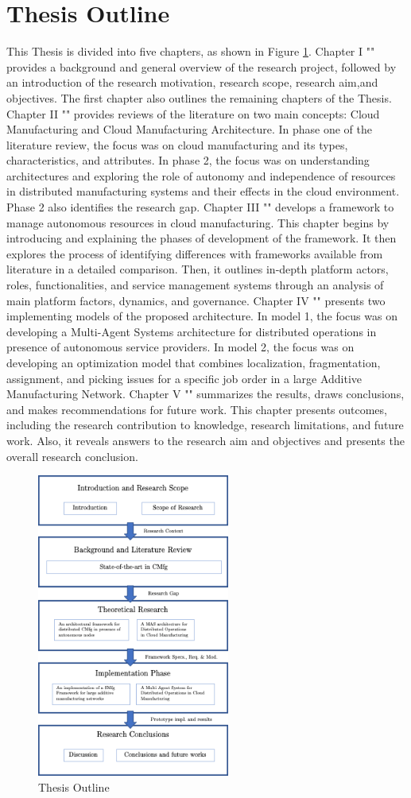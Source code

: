 \section{Thesis Outline}
This Thesis is divided into five chapters, as shown in Figure \ref{fig:thesis-outline}. Chapter I "" provides a background and general overview of the research project, followed by an introduction of the research motivation, research scope, research aim,and objectives. The first chapter also outlines the remaining chapters of the Thesis. Chapter II "" provides reviews of the literature on two main concepts: Cloud Manufacturing and Cloud Manufacturing Architecture. In phase one of the literature review, the focus was on cloud manufacturing and its types, characteristics, and attributes. In phase 2, the focus was on understanding architectures and exploring the role of autonomy and independence of resources in distributed manufacturing systems and their effects in the cloud environment. Phase 2 also identifies the research gap. Chapter III "" develops a framework to manage autonomous resources in cloud manufacturing. This chapter begins by introducing and explaining the phases of development of the framework. It then explores the process of identifying differences with frameworks available from literature in a detailed comparison. Then, it outlines in-depth platform actors, roles, functionalities, and service management systems through an analysis of main platform factors, dynamics, and governance. Chapter IV "" presents two implementing models of the proposed architecture. In model 1, the focus was on developing a Multi-Agent Systems architecture for distributed operations in presence of autonomous service providers. In model 2, the focus was on developing an optimization model that combines localization, fragmentation, assignment, and picking issues for a specific job order in a large Additive Manufacturing Network. Chapter V "" summarizes the results, draws conclusions, and makes recommendations for future work. This chapter presents outcomes, including the research contribution to knowledge, research limitations, and future work. Also, it reveals answers to the research aim and objectives and presents the overall research conclusion.

\begin{figure}[h]
    \centering
    \includegraphics[height=10cm, keepaspectratio]{images/thesis-outline.png}
    \caption{Thesis Outline}
    \label{fig:thesis-outline}
\end{figure}
